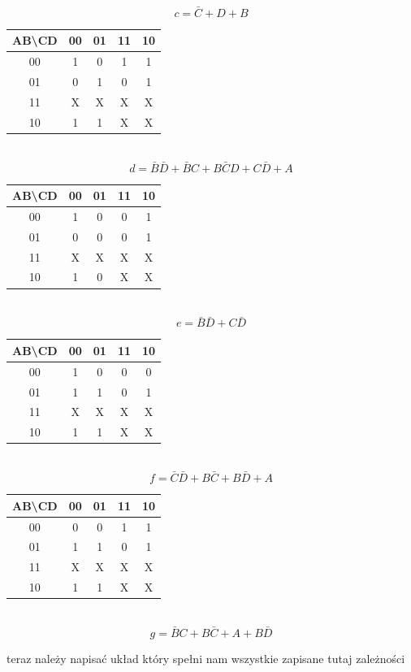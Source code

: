 \documentclass{article}
\begin{document}
\begin{enumerate}
\begin{enumerate}
\begin{center}
\begin{tabular}{|c|c|c|c|c|}
	\end{tabular}\\
	$$c= \bar{C} + D + B$$
	\begin{tabular}{|c|c|c|c|c|} 
	 \hline
	AB\textbackslash CD& 00 & 01 & 11 & 10\\  \hline
	 				 00&1&0&1&1\\ \hline
	 				 01&0&1&0&1\\ \hline
	 				 11&X&X&X&X\\ \hline
	 				 10&1&1&X&X\\ \hline

	\end{tabular}\\
	$$d = \bar{B} \bar{D} + \bar{B}C + B\bar{C}D + C\bar{D} + A$$
	\begin{tabular}{|c|c|c|c|c|} 
	 \hline
	AB\textbackslash CD& 00 & 01 & 11 & 10\\  \hline
	 				 00&1&0&0&1\\ \hline
	 				 01&0&0&0&1\\ \hline
	 				 11&X&X&X&X\\ \hline
	 				 10&1&0&X&X\\ \hline
	
	\end{tabular}\\
	$$ e = \bar{B}\bar{D} + C \bar{D}$$
	\begin{tabular}{|c|c|c|c|c|} 
	 \hline
	AB\textbackslash CD& 00 & 01 & 11 & 10\\  \hline
	 				 00&1&0&0&0\\ \hline
	 				 01&1&1&0&1\\ \hline
	 				 11&X&X&X&X\\ \hline
	 				 10&1&1&X&X\\ \hline
	
	\end{tabular}\\	
	$$f = \bar{C}\bar{D} + B \bar{C} + B\bar{D} + A$$	
	\begin{tabular}{|c|c|c|c|c|} 
	 \hline
	AB\textbackslash CD& 00 & 01 & 11 & 10\\  \hline
	 				 00&0&0&1&1\\ \hline
	 				 01&1&1&0&1\\ \hline
	 				 11&X&X&X&X\\ \hline
	 				 10&1&1&X&X\\ \hline
	\end{tabular}\\
	$$g = \bar{B}C + B\bar{C} + A + B\bar{D}$$
	\end{center}
	teraz należy napisać układ który spełni nam wszystkie zapisane tutaj zależności

\end{enumerate}
\end{enumerate}
\end{document}
